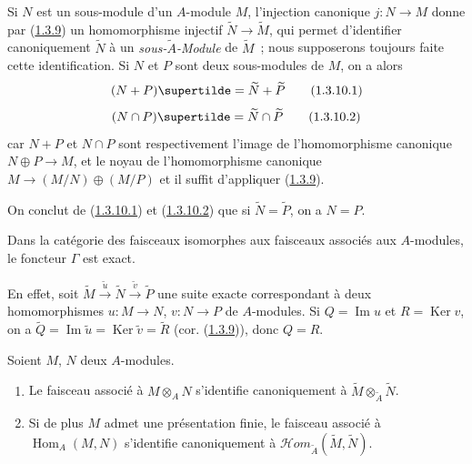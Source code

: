 \begin{env}[1.3.10]
\label{I.1.3.10-fr}
Si $N$ est un sous-module d'un $A$-module $M$, l'injection canonique
$j:N\to M$ donne par (\hyperref[I.1.3.9-fr]{1.3.9}) un homomorphisme injectif
$\widetilde{N}\to\widetilde{M}$, qui permet d'identifier canoniquement
$\widetilde{N}$ à un \emph{sous-$\widetilde{A}$-Module} de $\widetilde{M}$~;
nous supposerons toujours faite cette identification. Si $N$ et $P$ sont deux
sous-modules de $M$, on a alors
\begin{equation}
  (N+P)\supertilde=\widetilde{N}+\widetilde{P}
  \tag{1.3.10.1}\label{I.1.3.10.1-fr}
\end{equation}
\begin{equation}
  (N\cap P)\supertilde=\widetilde{N}\cap\widetilde{P}
  \tag{1.3.10.2}\label{I.1.3.10.2-fr}
\end{equation}
car $N+P$ et $N\cap P$ sont respectivement l'image de l'homomorphisme
canonique $N\oplus P\to M$, et le noyau de l'homomorphisme canonique
$M\to(M/N)\oplus(M/P)$ et il suffit d'appliquer
(\hyperref[I.1.3.9-fr]{1.3.9}).

On conclut de (\hyperref[I.1.3.10.1-fr]{1.3.10.1}) et
(\hyperref[I.1.3.10.2-fr]{1.3.10.2}) que si
$\widetilde{N}=\widetilde{P}$, on a $N=P$.
\end{env}

\begin{corollary}[1.3.11]
\label{I.1.3.11-fr}
Dans la catégorie des faisceaux isomorphes aux faisceaux associés aux
$A$-modules, le foncteur $\Gamma$ est exact.
\end{corollary}

En effet, soit
$\widetilde{M}\xrightarrow{\widetilde{u}}\widetilde{N}
\xrightarrow{\widetilde{v}}\widetilde{P}$ une suite exacte correspondant à
deux homomorphismes $u:M\to N$, $v:N\to P$ de $A$-modules. Si
$Q=\operatorname{Im}u$ et $R=\operatorname{Ker}v$, on a
$\widetilde{Q}=\operatorname{Im}\widetilde{u}
=\operatorname{Ker}\widetilde{v}=\widetilde{R}$
(cor. (\hyperref[I.1.3.9-fr]{1.3.9})), donc $Q=R$.

\begin{corollary}[1.3.12]
\label{I.1.3.12-fr}
Soient $M$, $N$ deux $A$-modules.
\begin{enumerate}
  \item[\rm(i)] Le faisceau associé à $M\otimes_A N$ s'identifie
  canoniquement à $\widetilde{M}\otimes_{\widetilde{A}}\widetilde{N}$.
  \item[\rm(ii)] Si de plus $M$ admet une présentation finie, le faisceau
  associé à $\operatorname{Hom}_A(M,N)$ s'identifie canoniquement à
  $\mathscr{H}\!om_{\widetilde{A}}(\widetilde{M},\widetilde{N})$.
\end{enumerate}
\end{corollary}


